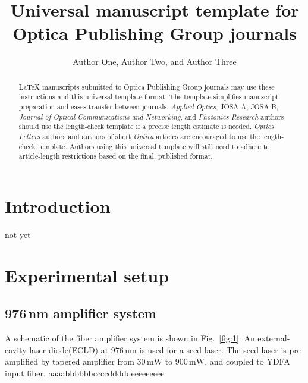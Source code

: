 \documentclass{osa-article}
\begin{document}
\title{Universal manuscript template for Optica Publishing Group journals}

\author{Author One, Author Two, and Author Three}

\address{Reserch Institute for Interdisciplinary Science, Okayama University, Okayama, Japan}




\begin{abstract}
\LaTeX{} manuscripts submitted to Optica Publishing Group journals may use these instructions and this universal template format.
The template simplifies manuscript preparation and eases transfer between journals.
\emph{Applied Optics}, JOSA A, JOSA B, \emph{Journal of Optical Communications and Networking}, and \emph{Photonics Research} authors should use the length-check template if a precise length estimate is needed.
\emph{Optics Letters} authors and authors of short \emph{Optica} articles are encouraged to use the length-check template.
Authors using this universal template will still need to adhere to article-length restrictions based on the final, published format.
\end{abstract}

\section{Introduction}
not yet

\section{Experimental setup}
\subsection{976\,nm amplifier system}

A schematic of the fiber amplifier system is shown in Fig.~\ref{fig:1}.
An external-cavity laser diode(ECLD) at $976\,\mathrm{nm}$ is used for a seed laser.
The seed laser is pre-amplified by tapered amplifier from $30\,\mathrm{mW}$ to $900\,\mathrm{mW}$, and coupled to YDFA input fiber.
aaaabbbbbbccccdddddeeeeeeeee
\end{document}
